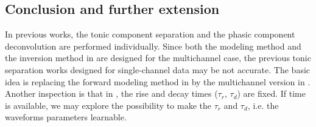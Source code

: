 \documentclass[10pt,conference]{ieeeconf}
\begin{document}
\subsection{Conclusion and further extension}

In previous works, the tonic component separation and the phasic component deconvolution are performed individually. Since both the modeling method and the inversion method in \cite{amin2019robust} are designed for the multichannel case, the previous tonic separation works designed for single-channel data may be not accurate. The basic idea is replacing the forward modeling method in \cite{amin2019tonic} by the multichannel version in \cite{amin2019robust}. Another inspection is that in \cite{amin2019robust}, the rise and decay times ($\tau_r$, $\tau_d$) are fixed. If time is available, we may explore the possibility to make the $\tau_r$ and $\tau_d$, i.e. the waveforms parameters learnable.



\end{document}
